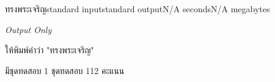\documentclass[11pt,a4paper]{article}
\begin{document}
\begin{problem}{ทรงพระเจริญ}{standard input}{standard output}{N/A seconds}{N/A megabytes}

\textit{Output Only}

ให้พิมพ์คำว่า "ทรงพระเจริญ"

มีชุดทดสอบ 1 ชุดทดสอบ 112 คะแนน

\end{problem}
\end{document}
